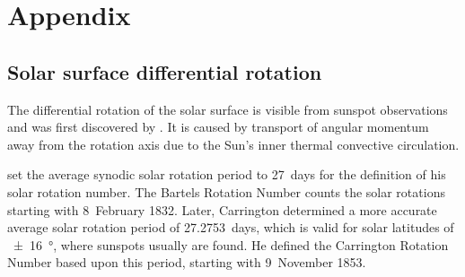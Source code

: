 
\chapter{Appendix}
\label{chap:appendix}

\section{Solar surface differential rotation}
\label{sec:solar_surface_differential_rotation}
The differential rotation of the solar surface is visible from sunspot observations and was first discovered by \citet{Scheiner1630}. It is caused by transport of angular momentum away from the rotation axis due to the Sun's inner thermal convective circulation.

\citet{Bartels1934} set the average synodic solar rotation period to 27~days for the definition of his solar rotation number. The Bartels Rotation Number counts the solar rotations starting with 8~February 1832. Later, Carrington determined a more accurate average solar rotation period of 27.2753~days, which is valid for solar latitudes of \SI{+-16}{\degree}, where sunspots usually are found. He defined the Carrington Rotation Number based upon this period, starting with 9~November 1853.

